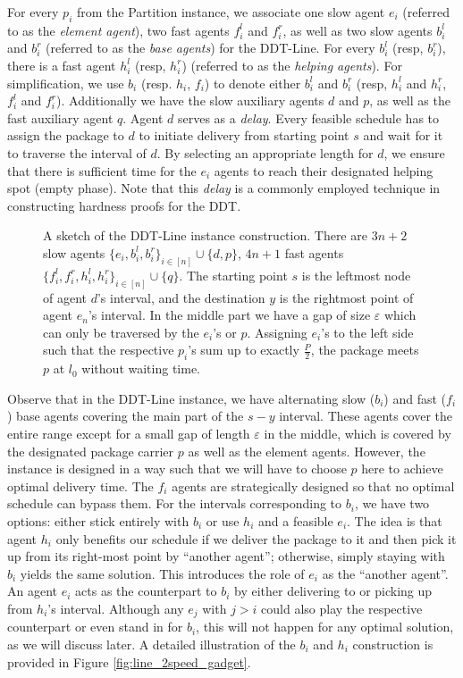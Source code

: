 For every $p_i$ from the Partition instance, we associate one slow agent $e_i$ (referred to as the \emph{element agent}), two fast agents $f_i^{l}$ and $f_i^{r}$, as well as two slow agents $b_i^l$ and $b_i^r$ (referred to as the \emph{base agents}) for the DDT-Line.  
For every $b_i^l$ (resp, $b_i^r$), there is a fast agent $h_i^l$ (resp, $h_i^r$) (referred to as the \emph{helping agents}).  For simplification, we use $b_i$ (resp. $ h_i $, $ f_i$) to denote either $b^l_i$ and  $b^r_i$ (resp, $h^l_i$ and  $h^r_i$, $f^l_i$ and  $f^r_i$). 
Additionally we have the slow auxiliary agents $d$ and $p$, as well as the fast auxiliary agent $q$. Agent $d$ serves as a \emph{delay}. Every feasible schedule has to assign the package to $d$ to initiate delivery from starting point $s$ and wait for it to traverse the interval of $d$. By selecting an appropriate length for $d$, we ensure that there is sufficient time for the $e_i$ agents to reach their designated helping spot (empty phase). Note that this \emph{delay} is a commonly employed technique in constructing hardness proofs for the DDT.   

\begin{figure}[ht]
    \centering
    
    \caption{A sketch of the DDT-Line instance construction. There are $3n+2$ slow agents $\{e_i, b^l_i, b^r_i\}_{i\in [n]} \cup \{d, p\}$, $4n+1$ fast agents $\{f^l_i,f^r_i, h^l_i, h^r_i\}_{i\in [n]} \cup \{q\}$. The starting point $s$ is the leftmost node of agent $d$'s interval, and the destination $y$ is the rightmost point of agent $e_n$'s interval. In the middle part we have a gap of size $\varepsilon$ which can only be traversed by the $e_i$'s or $p$. Assigning $e_i$'s to the left side such that the respective $p_i$'s sum up to exactly $\frac{P}{2}$, the package meets $p$ at $l_0$ without waiting time.}
\label{fig:line_2speed}
\end{figure} 


Observe that in the DDT-Line instance, we have alternating slow ($b_i$) and fast ($f_i$) base agents covering the main part of the $s-y$ interval. These agents cover the entire range except for a small gap of length  $\varepsilon$ in the middle, which is covered by the designated package carrier $p$ as well as the element agents. However, the instance is designed in a way such that we will have to choose $p$ here to achieve optimal delivery time. The $f_i$ agents are strategically designed so that no optimal schedule can bypass them. For the intervals corresponding to $b_i$, we have two options: either stick entirely with $b_i$ or use $h_i$ and a feasible $e_i$. The idea is that agent $h_i$ only benefits our schedule if we deliver the package to it and then pick it up from its right-most point by ``another agent''; otherwise, simply staying with $b_i $ yields the same solution. This introduces the role of $e_i$ as the ``another agent''. An agent $e_i$ acts as the counterpart to $b_i$ by either delivering to or picking up from $h_i$'s interval. Although any $e_j$ with $j>i$ could also play the respective counterpart or even stand in for $b_i$, this will not happen for any optimal solution, as we will discuss later. A detailed illustration of the $b_i$ and $h_i$ construction is provided in Figure  \ref{fig:line_2speed_gadget}.  

